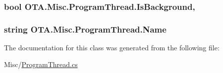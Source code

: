 \subsubsection[{Is\+Background}]{\setlength{\rightskip}{0pt plus 5cm}bool O\+T\+A.\+Misc.\+Program\+Thread.\+Is\+Background\hspace{0.3cm}{\ttfamily [get]}, {\ttfamily [set]}}\label{class_o_t_a_1_1_misc_1_1_program_thread_a13d9f1585ce295d69974132485e3deeb}
\hypertarget{class_o_t_a_1_1_misc_1_1_program_thread_aa390df72831267a88ae1ffdda3c18233}{}
\subsubsection[{Name}]{\setlength{\rightskip}{0pt plus 5cm}string O\+T\+A.\+Misc.\+Program\+Thread.\+Name\hspace{0.3cm}{\ttfamily [get]}}\label{class_o_t_a_1_1_misc_1_1_program_thread_aa390df72831267a88ae1ffdda3c18233}


The documentation for this class was generated from the following file\+:\begin{DoxyCompactItemize}
\item 
Misc/\hyperlink{_program_thread_8cs}{Program\+Thread.\+cs}\end{DoxyCompactItemize}
